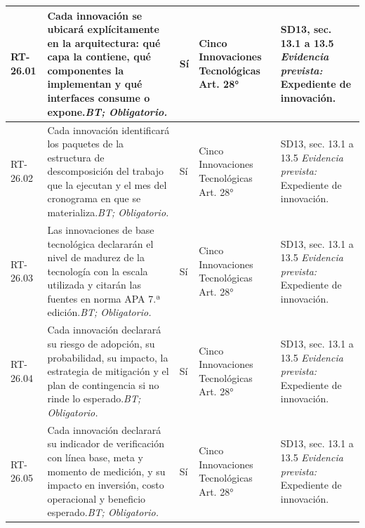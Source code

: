 \begin{paginaHorizontalSynaptix}
\begin{longtable}{|L{0.09\AnchoMatrizTDoce}|L{0.385\AnchoMatrizTDoce}|L{0.065\AnchoMatrizTDoce}|L{0.18\AnchoMatrizTDoce}|L{0.28\AnchoMatrizTDoce}|}
\endfoot

\hline

\endlastfoot


RT-\allowbreak{}26.\allowbreak{}01 &
Cada innovación se ubicará explícitamente en la arquitectura: qué capa la contiene, qué componentes la implementan y qué interfaces consume o expone.\newline\textit{BT; Obligatorio.} &
Sí &
Cinco Innovaciones Tecnológicas Art. 28° &
SD13, sec. 13.1 a 13.5 \newline\textit{Evidencia prevista:} Expediente de innovación. \\ \hline

RT-\allowbreak{}26.\allowbreak{}02 &
Cada innovación identificará los paquetes de la estructura de descomposición del trabajo que la ejecutan y el mes del cronograma en que se materializa.\newline\textit{BT; Obligatorio.} &
Sí &
Cinco Innovaciones Tecnológicas Art. 28° &
SD13, sec. 13.1 a 13.5 \newline\textit{Evidencia prevista:} Expediente de innovación. \\ \hline

RT-\allowbreak{}26.\allowbreak{}03 &
Las innovaciones de base tecnológica declararán el nivel de madurez de la tecnología con la escala utilizada y citarán las fuentes en norma APA 7.ª edición.\newline\textit{BT; Obligatorio.} &
Sí &
Cinco Innovaciones Tecnológicas Art. 28° &
SD13, sec. 13.1 a 13.5 \newline\textit{Evidencia prevista:} Expediente de innovación. \\ \hline

RT-\allowbreak{}26.\allowbreak{}04 &
Cada innovación declarará su riesgo de adopción, su probabilidad, su impacto, la estrategia de mitigación y el plan de contingencia si no rinde lo esperado.\newline\textit{BT; Obligatorio.} &
Sí &
Cinco Innovaciones Tecnológicas Art. 28° &
SD13, sec. 13.1 a 13.5 \newline\textit{Evidencia prevista:} Expediente de innovación. \\ \hline

RT-\allowbreak{}26.\allowbreak{}05 &
Cada innovación declarará su indicador de verificación con línea base, meta y momento de medición, y su impacto en inversión, costo operacional y beneficio esperado.\newline\textit{BT; Obligatorio.} &
Sí &
Cinco Innovaciones Tecnológicas Art. 28° &
SD13, sec. 13.1 a 13.5 \newline\textit{Evidencia prevista:} Expediente de innovación. \\ \hline


\end{longtable}
\end{paginaHorizontalSynaptix}
